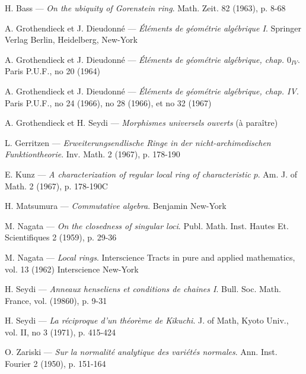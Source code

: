 \renewcommand{\bibname}{BIBLIOGRAPHIE}
\def\refname{B\MakeLowercase{IBLIOGRAPHIE}}
\begin{thebibliography}{99}\thispagestyle{empty}

  {\sc H. Bass} ---
  {\it On the ubiquity of Gorenstein ring}. Math. Zeit. 82 (1963), p. 8-68

  {\sc A. Grothendieck et J. Dieudonné} ---
  {\it Éléments de géométrie algébrique I}. Springer Verlag Berlin, Heidelberg, New-York

  {\sc A. Grothendieck et J. Dieudonné} ---
  {\it Éléments de géométrie algébrique, chap. $0_{IV}$}. Paris P.U.F., no 20 (1964)

  {\sc A. Grothendieck et J. Dieudonné} ---
  {\it Éléments de géométrie algébrique, chap. IV}. Paris P.U.F., no 24 (1966), no 28 (1966), et no 32 (1967)

  {\sc A. Grothendieck et H. Seydi} ---
  {\it Morphismes universels ouverts} (à paraître)

  {\sc L. Gerritzen} ---
  {\it Erweiterungsendlische Ringe in der nicht-archimedischen Funktiontheorie}. Inv. Math. 2 (1967), p. 178-190

  {\sc E. Kunz} ---
  {\it A characterization of regular local ring of characteristic $p$}. Am. J. of Math. 2 (1967), p. 178-190C

  {\sc H. Matsumura} ---
  {\it Commutative algebra}. Benjamin New-York

  {\sc M. Nagata} ---
  {\it On the closedness of singular loci}. Publ. Math. Inst. Hautes Et. Scientifiques 2 (1959), p. 29-36

  {\sc M. Nagata} ---
  {\it Local rings}. Interscience Tracts in pure and applied mathematics, vol. 13 (1962) Interscience New-York

  {\sc H. Seydi} ---
  {\it Anneaux henseliens et conditions de chaines I}. Bull. Soc. Math. France, vol. (19860), p. 9-31

  {\sc H. Seydi} ---
  {\it La réciproque d’un théorème de Kikuchi}. J. of Math, Kyoto Univ., vol. II, no 3 (1971), p. 415-424

  {\sc O. Zariski} ---
  {\it Sur la normalité analytique des variétés normales}. Ann. Inst. Fourier 2 (1950), p. 151-164


\end{thebibliography}
